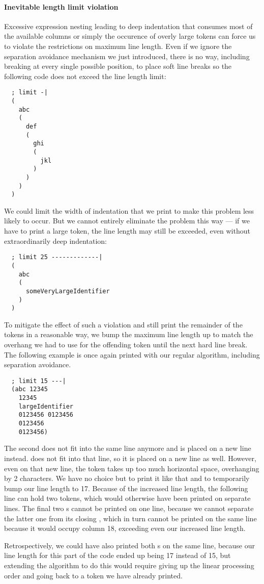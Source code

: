 \paragraph{Inevitable length limit violation}
Excessive expression nesting leading to deep indentation
that consumes most of the available columns
or simply the occurence of overly large tokens
can force us to violate the restrictions on maximum line length.
Even if we ignore the separation avoidance mechanism we just introduced,
there is no way, including breaking at every single possible position,
to place soft line breaks so the following code does not exceed the line length limit:
\begin{verbatim}
  ; limit -|
  (
    abc
    (
      def
      (
        ghi
        (
          jkl
        )
      )
    )
  )
\end{verbatim}
We could limit the width of indentation that we print to make this problem less likely to occur.
But we cannot entirely eliminate the problem this way ---
if we have to print a large token, the line length may still be exceeded,
even without extraordinarily deep indentation:
\begin{verbatim}
  ; limit 25 -------------|
  (
    abc
    (
      someVeryLargeIdentifier
    )
  )
\end{verbatim}

To mitigate the effect of such a violation and still
print the remainder of the tokens in a reasonable way,
we bump the maximum line length up to match
the overhang we had to use for the offending token
until the next hard line break.
The following example is once again printed with our regular algorithm,
including separation avoidance.
\begin{verbatim}
  ; limit 15 ---|
  (abc 12345
    12345
    largeIdentifier
    0123456 0123456
    0123456
    0123456)
\end{verbatim}
The second  does not fit into the same line anymore and is placed on a new line instead.
 does not fit into that line, so it is placed on a new line as well.
However, even on that new line,
the token takes up too much horizontal space, overhanging by 2 characters.
We have no choice but to print it like that and to temporarily bump our line length to 17.
Because of the increased line length, the following line can hold two  tokens,
which would otherwise have been printed on separate lines.
The final two s cannot be printed on one line,
because we cannot separate the latter one from its closing ,
which in turn cannot be printed on the same line because it would occupy column 18,
exceeding even our increased line length.

Retrospectively, we could have also printed both s on the same line,
because our line length for this part of the code ended up being 17 instead of 15,
but extending the algorithm to do this would require giving up the linear processing order
and going back to a token we have already printed.
